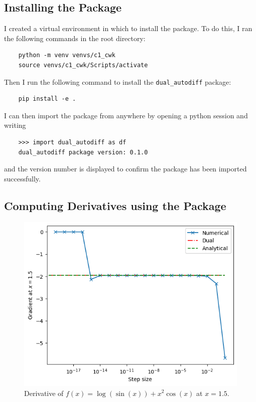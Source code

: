 \documentclass{article}
\begin{document}
\subsection{ Installing the Package }
I created a virtual environment in which to install the package. To do this, I ran the following commands in the root directory:
\begin{lstlisting}
    python -m venv venvs/c1_cwk
    source venvs/c1_cwk/Scripts/activate
\end{lstlisting}
Then I run the following command to install the \texttt{dual\_autodiff} package:
\begin{lstlisting}
    pip install -e .
\end{lstlisting}
I can then import the package from anywhere by opening a python session and writing
\begin{lstlisting}
    >>> import dual_autodiff as df
    dual_autodiff package version: 0.1.0
\end{lstlisting}
and the version number is displayed to confirm the package has been imported successfully.

\subsection{ Computing Derivatives using the Package } \label{compderivs}

\begin{figure}[h!]
    \centering
    \includegraphics[width=0.7\linewidth]{q5_derivative.png}
    \caption{Derivative of \(f(x) = \log(\sin(x)) +x^2 \cos(x)\) at \(x=1.5\).}
    \label{fig:q5_derivative}
\end{figure}
\end{document}
